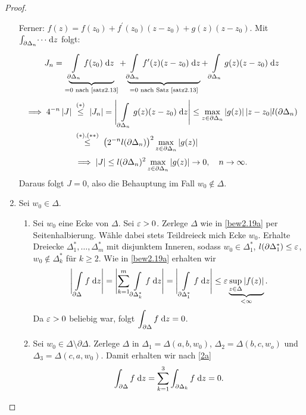 \documentclass[a4paper,twoside,DIV15,BCOR12mm]{scrbook}
\begin{document}
\begin{proof}
\begin{enumerate}[label=(\arabic*),ref=(\arabic*)]
Ferner: $f(z)=f(z_0) + f^\prime(z_0)(z-z_0) + g(z)(z-z_0)$. Mit $\int_{\partial\Delta_n}^{}{\dotsi}\;\mathrm{d} z$ folgt:
\[ J_n = \underbrace{\int\limits_{\partial\Delta_n}^{}{f(z_0)}\;\mathrm{d}z}_{=0 \text{ nach \ref{satz2.13}}} +
\underbrace{\int\limits_{\partial\Delta_n}^{}{f^\prime(z)(z-z_0)}\;\mathrm{d}z}_{=0 \text{ nach Satz \ref{satz2.13}}} + \int\limits_{\partial\Delta_n}^{}{g(z)(z-z_0)}\;\mathrm{d}z \]
\begin{align*}
  \folgt 4^{-n}\abs{J} &\nach{\le}{($*$)} \abs{J_n} = \Biggl\lvert\,\Integral{\partial\Delta_n}{}{g(z)(z-z_0)}{z}\Biggr\rvert \le
  \max_{z\in\partial\Delta_n}{\abs{g(z)}\abs{z-z_0}}l(\partial\Delta_n) \\
  &\nach{\le}{($*$),($**$)} \left(2^{-n}l(\partial\Delta_n)\right)^2 \max_{z\in\partial\Delta_n}{\abs{g(z)}}
\end{align*}
\[ \implies \left\lvert J\right\lvert \le l(\partial\Delta_n)^2 \max_{z\in\partial\Delta_n}{\left\lvert g(z)\right\lvert} \to 0, \quad n\rightarrow\infty. \]
Daraus folgt $J=0$, also die Behauptung im Fall $w_0\notin\Delta$.
\item Sei $w_0\in\Delta$.
  \begin{enumerate}[label=(\alph*),ref=(\alph*)]
  \item \label{2a} Sei $w_0$ eine Ecke von $\Delta$. Sei $\varepsilon>0$. Zerlege $\Delta$ wie in \ref{bew2.19a} per Seitenhalbierung. Wähle dabei
    stets Teildreieck mich Ecke $w_0$. Erhalte Dreiecke $\Delta_1^*,\dotsc,\Delta_m^*$ mit disjunktem Inneren, sodass
    $w_0\in\Delta_1^*$, $l(\partial\Delta_1^*)\le\varepsilon$, $w_0\notin\Delta_k^*$ für $k\ge2$. Wie in \ref{bew2.19a} erhalten
    wir \[\Biggl\lvert\,\int\limits_{\partial\Delta}^{}{f}\;\mathrm{d}z\Biggr\rvert = \Biggl\lvert\sum_{k=1}^m{\int\limits_{\partial\Delta_k^*}^{}{f}\;\mathrm{d}z}\Biggr\rvert =
    \Biggl\lvert\,\int\limits_{\partial\Delta_1^*}^{}{f}\;\mathrm{d}z\Biggr\rvert \le \varepsilon \underbrace{\sup_{z\in\Delta}{\left\lvert f(z)\right\lvert}}_{<\infty}. \]
    Da $\varepsilon>0$ beliebig war, folgt $\displaystyle\int_{\partial\Delta}^{}{f}\;\mathrm{d} z = 0$.
  \item \label{2b} Sei $w_0\in\Delta\setminus\partial\Delta$. Zerlege $\Delta$ in $\Delta_1=\Delta(a,b,w_0)$,
    $\Delta_2=\Delta(b,c,w_o)$
    und $\Delta_3=\Delta(c,a,w_0)$. Damit erhalten wir nach \ref{2a}
    \[ \int_{\partial\Delta}^{}{f}\;\mathrm{d} z = \sum_{k=1}^{3}{\int_{\partial\Delta_k}^{}{f}\;\mathrm{d} z} = 0. \]
    \begin{center}
\end{center}
\end{enumerate}
\end{enumerate}
\end{proof}
\end{document}
